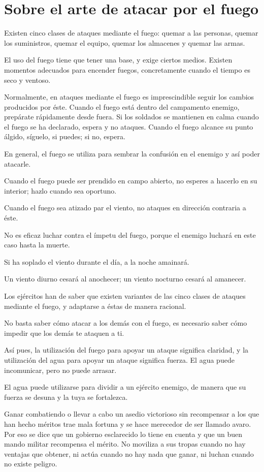 \chapter{Sobre el arte de atacar por el fuego}

Existen cinco clases de ataques mediante el fuego: quemar a las personas, quemar los suministros, quemar el equipo, quemar los almacenes y quemar las armas.

El uso del fuego tiene que tener una base, y exige ciertos medios. Existen momentos adecuados para encender fuegos, concretamente cuando el tiempo es seco y ventoso.

Normalmente, en ataques mediante el fuego es imprescindible seguir los cambios producidos por éste. Cuando el fuego está dentro del campamento enemigo, prepárate rápidamente desde fuera. Si los soldados se mantienen en calma cuando el fuego se ha declarado, espera y no ataques. Cuando el fuego alcance su punto álgido, síguelo, si puedes; si no, espera.

En general, el fuego se utiliza para sembrar la confusión en el enemigo y así poder atacarle.

Cuando el fuego puede ser prendido en campo abierto, no esperes a hacerlo en su interior; hazlo cuando sea oportuno.

Cuando el fuego sea atizado par el viento, no ataques en dirección contraria a éste.

No es eficaz luchar contra el ímpetu del fuego, porque el enemigo luchará en este caso hasta la muerte.

Si ha soplado el viento durante el día, a la noche amainará.

Un viento diurno cesará al anochecer; un viento nocturno cesará al amanecer.

Los ejércitos han de saber que existen variantes de las cinco clases de ataques mediante el fuego, y adaptarse a éstas de manera racional.

No basta saber cómo atacar a los demás con el fuego, es necesario saber cómo impedir que los demás te ataquen a ti.

Así pues, la utilización del fuego para apoyar un ataque significa claridad, y la utilización del agua para apoyar un ataque significa fuerza. El agua puede incomunicar, pero no puede arrasar.

El agua puede utilizarse para dividir a un ejército enemigo, de manera que su fuerza se desuna y la tuya se fortalezca.

Ganar combatiendo o llevar a cabo un asedio victorioso sin recompensar a los que han hecho méritos trae mala fortuna y se hace merecedor de ser llamado avaro. Por eso se dice que un gobierno esclarecido lo tiene en cuenta y que un buen mando militar recompensa el mérito. No moviliza a sus tropas cuando no hay ventajas que obtener, ni actúa cuando no hay nada que ganar, ni luchan cuando no existe peligro.

